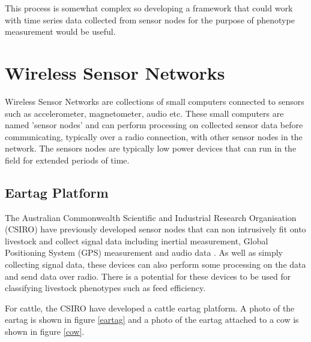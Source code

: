 This process is somewhat complex so developing a framework that could work with time series data collected from sensor nodes for the purpose of phenotype measurement would be useful. 

\section{Wireless Sensor Networks}
Wireless Sensor Networks are collections of small computers connected to sensors such as accelerometer, magnetometer, audio etc. These small computers are named 'sensor nodes' and can perform processing on collected sensor data before communicating, typically over a radio connection, with other sensor nodes in the network.  The sensors nodes are typically low power devices that can run in the field for extended periods of time. \cite{lewis2004wireless}

\subsection{Eartag Platform}
The Australian Commonwealth Scientific and Industrial Research Organisation (CSIRO) have previously developed sensor nodes that can non intrusively fit onto livestock and collect signal data including inertial measurement, Global Positioning System (GPS) measurement and audio data \cite{Guo2006}. As well as simply collecting signal data, these devices can also perform some processing on the data and send data over radio. There is a potential for these devices to be used for classifying livestock phenotypes such as feed efficiency.

For cattle, the CSIRO have developed a cattle eartag platform. A photo of the eartag is shown in figure \ref{eartag} and a photo of the eartag attached to a cow is shown in figure \ref{cow}.

